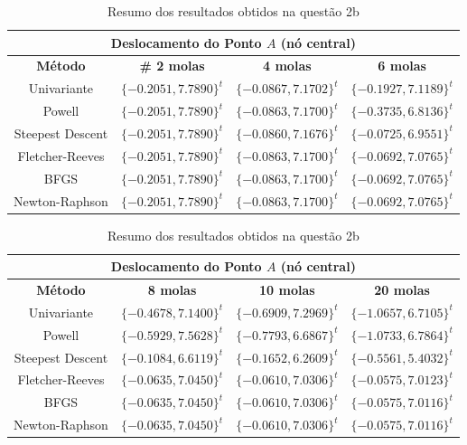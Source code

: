 \documentclass[10pt, a4paper]{article}
\begin{document}
\begin{table}[H]
  \begin{center}
    \begin{tabular}{c|c|c|c}
      \multicolumn{4}{c}{Deslocamento do Ponto $A$ (nó central)}\\
      \hline
      \textbf{Método} & \textbf{\# 2 molas} & \textbf{4 molas} & \textbf{6 molas} \\
      \hline
      Univariante       & $\{-0.2051, 7.7890\}^t$ &	$\{-0.0867, 7.1702\}^t$ &	$\{-0.1927, 7.1189\}^t$ \\
      Powell	          & $\{-0.2051, 7.7890\}^t$ &	$\{-0.0863, 7.1700\}^t$ &	$\{-0.3735, 6.8136\}^t$ \\
      Steepest Descent  & $\{-0.2051, 7.7890\}^t$ &	$\{-0.0860, 7.1676\}^t$ &	$\{-0.0725, 6.9551\}^t$ \\
      Fletcher-Reeves   & $\{-0.2051, 7.7890\}^t$ &	$\{-0.0863, 7.1700\}^t$ &	$\{-0.0692, 7.0765\}^t$ \\
      BFGS	            & $\{-0.2051, 7.7890\}^t$ &	$\{-0.0863, 7.1700\}^t$ &	$\{-0.0692, 7.0765\}^t$ \\
      Newton-Raphson    & $\{-0.2051, 7.7890\}^t$ &	$\{-0.0863, 7.1700\}^t$ &	$\{-0.0692, 7.0765\}^t$
    \end{tabular}
  \end{center}
  \caption{Resumo dos resultados obtidos na questão 2b}
\end{table}

\begin{table}[H]
  \begin{center}
    \begin{tabular}{c|c|c|c}
      \multicolumn{4}{c}{Deslocamento do Ponto $A$ (nó central)}\\
      \hline
      \textbf{Método}   & \textbf{8 molas} & \textbf{10 molas} & \textbf{20 molas} \\
      \hline
      Univariante       & $\{-0.4678, 7.1400\}^t$	& $\{-0.6909, 7.2969\}^t$ &	$\{-1.0657, 6.7105\}^t$ \\
      Powell	          & $\{-0.5929, 7.5628\}^t$	& $\{-0.7793, 6.6867\}^t$ &	$\{-1.0733, 6.7864\}^t$ \\
      Steepest Descent  & $\{-0.1084, 6.6119\}^t$	& $\{-0.1652, 6.2609\}^t$ &	$\{-0.5561, 5.4032\}^t$ \\
      Fletcher-Reeves   & $\{-0.0635, 7.0450\}^t$	& $\{-0.0610, 7.0306\}^t$ &	$\{-0.0575, 7.0123\}^t$ \\
      BFGS	            & $\{-0.0635, 7.0450\}^t$	& $\{-0.0610, 7.0306\}^t$ &	$\{-0.0575, 7.0116\}^t$ \\
      Newton-Raphson    & $\{-0.0635, 7.0450\}^t$	& $\{-0.0610, 7.0306\}^t$ &	$\{-0.0575, 7.0116\}^t$
    \end{tabular}
  \end{center}
  \caption{Resumo dos resultados obtidos na questão 2b}
\end{table}
\end{document}
